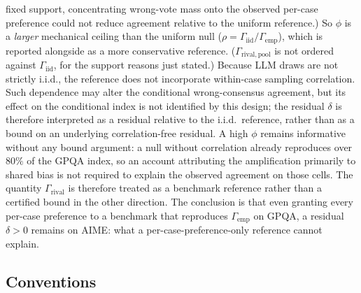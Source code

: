 \documentclass[a4paper,fleqn]{cas-sc}
\newcommand{\agreementIndex}{\Gamma}
\begin{document}
fixed support, concentrating wrong-vote mass onto the observed per-case
preference could not reduce agreement relative to the uniform
reference.) So $\phi$ is a
\emph{larger} mechanical ceiling than the uniform null ($\rho=\agreementIndex_{\mathrm{iid}}/\agreementIndex_{\mathrm{emp}}$),
which is reported alongside as a more conservative reference.
($\agreementIndex_{\mathrm{rival,pool}}$ is not ordered against
$\agreementIndex_{\mathrm{iid}}$, for the support reasons just stated.)
Because LLM draws are not strictly i.i.d., the reference does not
incorporate within-case sampling correlation. Such dependence may alter
the conditional wrong-consensus agreement, but its effect on the
conditional index is not identified by this design; the residual
$\delta$ is therefore interpreted as a residual relative to the i.i.d.\ 
reference, rather than as a bound on an underlying correlation-free
residual. A high $\phi$ remains informative without any bound argument:
a null without correlation already reproduces over $80\%$ of the GPQA
index, so an account attributing the amplification primarily to shared
bias is not required to explain the observed agreement on those cells.
The quantity $\agreementIndex_{\mathrm{rival}}$ is therefore treated as a
benchmark reference rather than a
certified bound in the other direction. The conclusion is that even granting every
per-case preference to a benchmark that reproduces $\agreementIndex_{\mathrm{emp}}$
on GPQA, a residual $\delta>0$ remains on AIME: what a
per-case-preference-only reference cannot explain.

\subsection{Conventions}
\label{sec:conventions}
\end{document}

